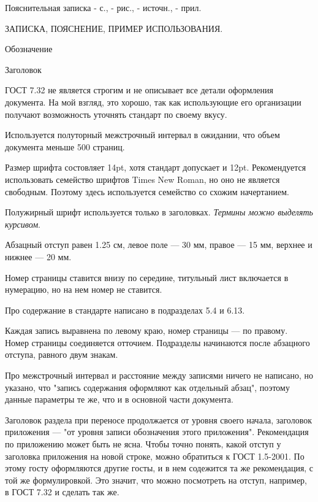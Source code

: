 






Пояснительная записка - с., - рис., - источн., - прил.

ЗАПИСКА, ПОЯСНЕНИЕ, ПРИМЕР ИСПОЛЬЗОВАНИЯ.




Обозначение

Заголовок


ГОСТ 7.32 не является строгим и не описывает все детали оформления документа.
На мой взгляд, это хорошо, так как использующие его организации получают
возможность уточнять стандарт по своему вкусу.

Используется полуторный межстрочный интервал в ожидании, что объем документа
меньше 500 страниц. 

Размер шрифта состовляет 14pt, хотя стандарт допускает и
12pt. Рекомендуется использовать семейство шрифтов Times New Roman, но оно не
является свободным. Поэтому здесь используется семейство со схожим начертанием.

Полужирный шрифт используется только в заголовках. \emph{Термины можно выделять
курсивом}.

Абзацный отступ равен 1.25 см, левое поле --- 30 мм, правое --- 15 мм, верхнее
и нижнее --- 20 мм.

Номер страницы ставится внизу по середине, титульный лист включается в нумерацию,
но на нем номер не ставится.



Про содержание в стандарте написано в подразделах 5.4 и 6.13.

Каждая запись выравнена по левому краю, номер страницы --- по правому. Номер
страницы соединяется отточием. Подразделы начинаются после абзацного отступа,
равного двум знакам.

Про межстрочный интервал и расстояние между записями ничего не написано, но
указано, что "запись содержания оформляют как отдельный абзац", поэтому данные
параметры те же, что и в основной части документа.

Заголовок раздела при переносе продолжается от уровня своего начала, заголовок
приложения --- "от уровня записи обозначения этого приложения". Рекомендация
по приложению может быть не ясна. Чтобы точно понять, какой отступ у заголовка
приложения на новой строке, можно обратиться к ГОСТ 1.5-2001. По этому госту
оформляются другие госты, и в нем содежится та же рекомендация, с той же
формулировкой. Это значит, что можно посмотреть на отступ, например, в ГОСТ
7.32 и сделать так же.


